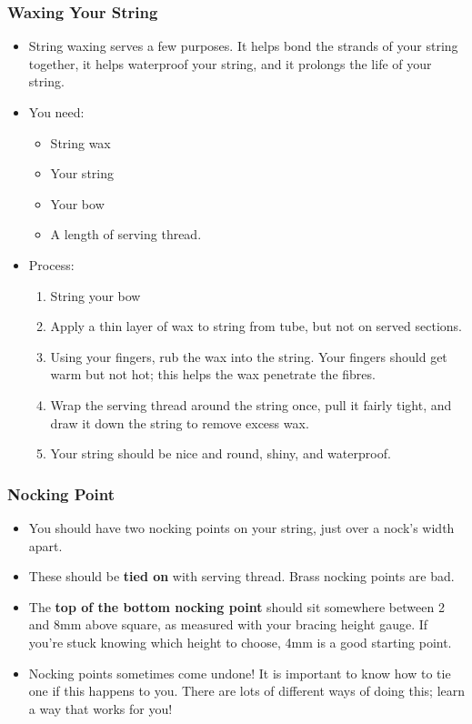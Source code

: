 \documentclass[12pt]{article}
\begin{document}
\subsubsection*{Waxing Your String}

\begin{itemize}
	\item String waxing serves a few purposes. It helps bond the strands of your
		string together, it helps waterproof your string, and it prolongs the
		life of your string.
	\item You need: 
		\begin{itemize}
			\item String wax
			\item Your string
			\item Your bow
			\item A length of serving thread.
		\end{itemize}
	\item Process:
		\begin{enumerate}
			\item String your bow
			\item Apply a thin layer of wax to string from tube, but not on
				served sections.
			\item Using your fingers, rub the wax into the string. Your fingers
				should get warm but not hot; this helps the wax penetrate the
				fibres.
			\item Wrap the serving thread around the string once, pull it fairly
				tight, and draw it down the string to remove excess wax.
			\item Your string should be nice and round, shiny, and waterproof.
	\end{enumerate}
\end{itemize}

\subsubsection*{Nocking Point}

\begin{itemize}
	\item You should have two nocking points on your string, just over a nock's
		width apart.
	\item These should be {\bf tied on} with serving thread. Brass nocking
		points are bad.
	\item The {\bf top of the bottom nocking point} should sit somewhere between 2 and
		8mm above square, as measured with your bracing height gauge. If you're
		stuck knowing which height to choose, 4mm is a good starting point.
	\item Nocking points sometimes come undone! It is important to know how to
		tie one if this happens to you. There are lots of different ways of
		doing this; learn a way that works for you!
\end{itemize}
\end{document}
